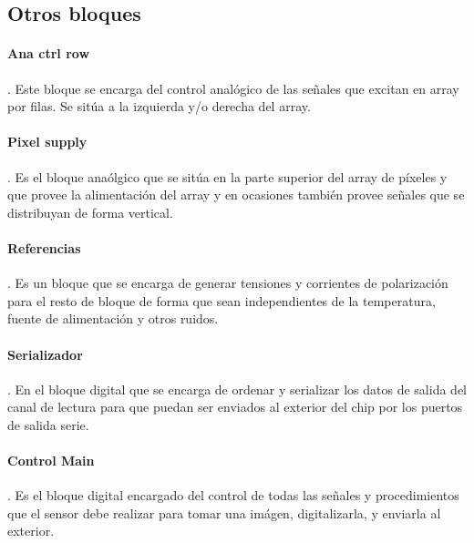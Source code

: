 \subsection{Otros bloques}

\paragraph{Ana ctrl row}. Este bloque se encarga del control analógico de las
señales que excitan en array por filas. Se sitúa a la izquierda y/o derecha del
array.\\

\paragraph{Pixel supply}. Es el bloque anaólgico que se sitúa en la parte superior
del array de píxeles y que provee la alimentación del array
y en ocasiones también provee señales que se distribuyan de forma vertical.\\

\paragraph{Referencias}. Es un bloque que se encarga de generar tensiones y corrientes
de polarización para el resto de bloque de forma que sean independientes de la
temperatura, fuente de alimentación y otros ruidos.\\

\paragraph{Serializador}. En el bloque digital que se encarga de ordenar y serializar
los datos de salida del canal de lectura para que puedan ser enviados al exterior del
chip por los puertos de salida serie.\\

\paragraph{Control Main}. Es el bloque digital encargado del control de todas las
señales y procedimientos que el sensor debe realizar para tomar una imágen, digitalizarla,
y enviarla al exterior.\\
